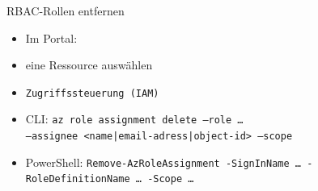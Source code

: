 \begin{flashcard}[Definition]{RBAC-Rollen entfernen}
    \begin{itemize}
        \item Im Portal:\newline
            \item eine Ressource auswählen
            \item \texttt{Zugriffssteuerung (IAM)}
        \item CLI:\newline
            \texttt{az role assignment delete --role \ldots\\--assignee <name|email-adress|object-id> --scope}
        \item PowerShell:\newline
            \texttt{Remove-AzRoleAssignment -SignInName \ldots\ -RoleDefinitionName \ldots\ -Scope \ldots}
    \end{itemize}
\end{flashcard}
